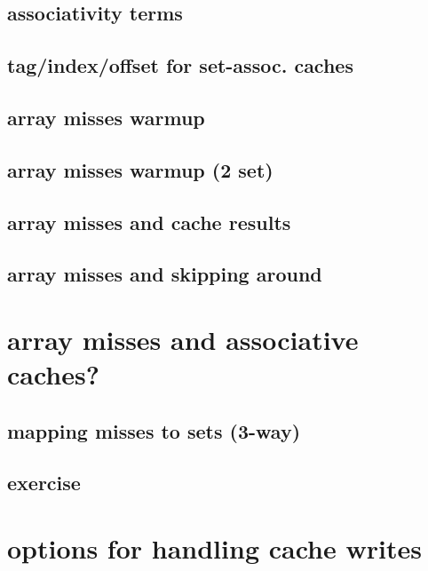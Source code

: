 \subsection{associativity terms}


\subsection{tag/index/offset for set-assoc. caches}


\subsection{array misses warmup}


\subsection{array misses warmup (2 set)}


\subsection{array misses and cache results}


\subsection{array misses and skipping around}


\section{array misses and associative caches?}
\subsection{mapping misses to sets (3-way)}

\subsection{exercise}


\section{options for handling cache writes}


